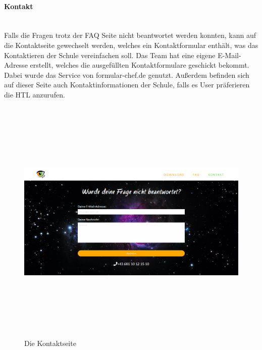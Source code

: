 \paragraph{Kontakt} \leavevmode \\
Falls die Fragen trotz der FAQ Seite nicht beantwortet werden konnten, kann auf die Kontaktseite gewechselt werden, welches ein Kontaktformular enthält, was das Kontaktieren der Schule vereinfachen soll.
Das Team hat eine eigene E-Mail-Adresse erstellt, welches die ausgefüllten Kontaktformulare geschickt bekommt. Dabei wurde das Service von formular-chef.de genutzt. Außerdem befinden sich auf dieser Seite auch Kontaktinformationen der Schule, falls es User präferieren die HTL anzurufen.
\begin{figure}[hb]
	\centering				\includegraphics[width=12cm,height=12cm,keepaspectratio]{webseite_abb7} 
	\caption{Die Kontaktseite}
\end{figure} \leavevmode \newline

